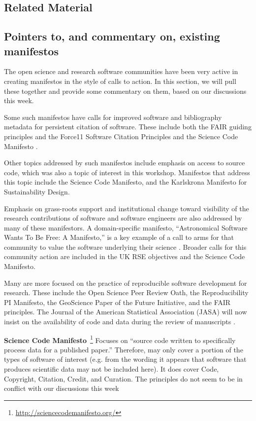\documentclass[a4paper,UKenglish]{dagman}
\newcommand{\manifesto}[1]{{\bf #1}\xspace}
\begin{document}
\begin{appendix}
\section{Related Material}

\subsection*{Pointers to, and commentary on, existing manifestos}
The open science and research software communities have been very active in creating manifestos in the style of calls to action. In this section, we will pull these together and provide some commentary on them, based on our discussions this week.

Some such manifestos have calls for improved software and bibliography metadata for persistent citation of software. These include both the FAIR guiding principles and the Force11 Software Citation Principles and the Science Code Manifesto \cite{wilkinson_fair_2016,arfon_m._smith_software_2016,nick_barnes_science_2013}.

Other topics addressed by such manifestos include emphasis on access to source code, which was also a topic of interest in this workshop. Manifestos that address this topic include the Science Code Manifesto, and the Karlskrona Manifesto for Sustainability Design. 

Emphasis on grass-roots support and institutional change toward visibility of the research contributions of software and software engineers are also addressed by many of these manifestors. A domain-specific manifesto, ``Astronomical Software Wants To Be Free: A Manifesto,'' is a key example of a call to arms for that community to value the software underlying their science \cite{weiner_astronomical_2009}. Broader calls for this community action are included in the  UK RSE objectives and the Science Code Manifesto.

Many are more focused on the practice of reproducible software development for research. These include the Open Science Peer Review Oath, the Reproducibility PI Manifesto, the GeoScience Paper of the Future Initiative, and the FAIR principles. 
The Journal of the American Statistical Association (JASA) will now insist on the availability of code and data during the review of manuscripts \cite{Baker2016}.

\manifesto{Science Code Manifesto}~\cite{nick_barnes_science_2013}\footnote{\url{http://sciencecodemanifesto.org/}}
Focuses on ``source code written to specifically process data for a published paper.''
Therefore, may only cover a portion of the types of software of interest (e.g. from the wording it appears that software that produces scientific data may not be included here).
It does cover Code, Copyright, Citation, Credit, and Curation.
The principles do not seem to be in conflict with our discussions this week


\end{appendix}
\end{document}

